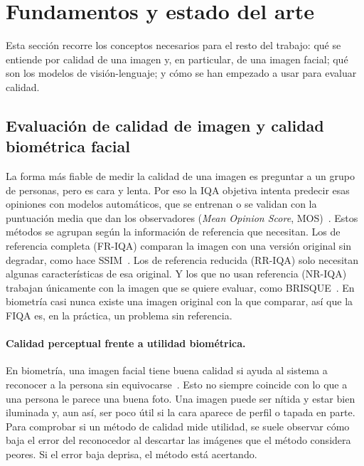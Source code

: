 \section{Fundamentos y estado del arte}
\label{sec:arte}
Esta sección recorre los conceptos necesarios para el resto del trabajo: qué se entiende por calidad de una imagen y, en particular, de una imagen facial; qué son los modelos de visión-lenguaje; y cómo se han empezado a usar para evaluar calidad.

\subsection{Evaluación de calidad de imagen y calidad biométrica facial}
\label{sec:iqa}

La forma más fiable de medir la calidad de una imagen es preguntar a un grupo de personas, pero es cara y lenta. Por eso la IQA objetiva intenta predecir esas opiniones con modelos automáticos, que se entrenan o se validan con la puntuación media que dan los observadores (\textit{Mean Opinion Score}, MOS)~\cite{Zhang_2025_TOMM}. Estos métodos se agrupan según la información de referencia que necesitan. Los de referencia completa (FR-IQA) comparan la imagen con una versión original sin degradar, como hace SSIM~\cite{Wang_2004_TIP}. Los de referencia reducida (RR-IQA) solo necesitan algunas características de esa original. Y los que no usan referencia (NR-IQA) trabajan únicamente con la imagen que se quiere evaluar, como BRISQUE~\cite{Mittal_2012_TIP}. En biometría casi nunca existe una imagen original con la que comparar, así que la FIQA es, en la práctica, un problema sin referencia.

\paragraph{Calidad perceptual frente a utilidad biométrica.} En biometría, una imagen facial tiene buena calidad si ayuda al sistema a reconocer a la persona sin equivocarse~\cite{Schlett_2022_CSUR}. Esto no siempre coincide con lo que a una persona le parece una buena foto. Una imagen puede ser nítida y estar bien iluminada y, aun así, ser poco útil si la cara aparece de perfil o tapada en parte. Para comprobar si un método de calidad mide utilidad, se suele observar cómo baja el error del reconocedor al descartar las imágenes que el método considera peores. Si el error baja deprisa, el método está acertando.

